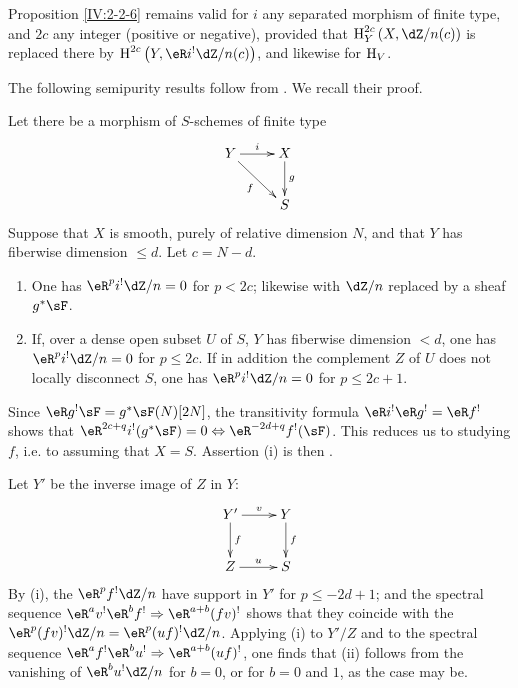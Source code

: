 Proposition \ref{IV:2-2-6} remains valid for $i$ any separated morphism of
finite type, and $2 c$ any integer (positive or negative), provided that
$\h_Y^{2 c}\left(X,\dZ/n(c)\right)$ is replaced there by
$\h^{2 c}\left(Y,\eR i^!\dZ/n(c)\right)$, and likewise for $\operatorname{H}_V$.

The following semipurity results follow from \cite[1.8, 1.10, 1.15]{sga2}.
We recall their proof.






\begin{theorem}\label{IV:2-2-8}
Let there be a morphism of $S$-schemes of finite type
\[\xymatrix{
  Y \ar[r]^-i \ar[dr]_-f
    & X \ar[d]^-g \\
  & S
}\]
Suppose that $X$ is smooth, purely of relative dimension $N$, and that $Y$
has fiberwise dimension $\leqslant d$. Let $c=N-d$.
\begin{enumerate}[\indent (i)]
  \item One has $\eR^p i^!\dZ/n=0$ for $p<2 c$; likewise with $\dZ/n$
    replaced by a sheaf $g^* \sF$.
  \item If, over a dense open subset $U$ of $S$, $Y$ has fiberwise dimension
    $<d$, one has $\eR^p i^!\dZ/n=0$ for $p\leqslant 2 c$. If in addition
    the complement $Z$ of $U$ does not locally disconnect $S$, one has
    $\eR^pi^!\dZ/n=0$ for $p\leqslant 2 c+1$.
\end{enumerate}
\end{theorem}

Since $\eR g^! \sF=g^*\sF(N)[2N]$, the transitivity formula
$\eR i^!\eR g^!=\eR f^!$ shows that
$\eR^{2 c+q} i^!(g^*\sF)=0\Leftrightarrow \eR^{-2 d+q}f^!(\sF)$. This reduces
us to studying $f$, i.e. to assuming that $X=S$. Assertion (i) is then
\cite[XVIII 3.17]{sga4}.

Let $Y'$ be the inverse image of $Z$ in $Y$:
\[\xymatrix{
  Y' \ar[r]^-v \ar[d]^-f
    & Y \ar[d]^-f \\
  Z \ar[r]^-u
    & S
}\]
By (i), the $\eR^p f^! \dZ/n$ have support in $Y'$ for
$p\leqslant -2 d+1$; and the spectral sequence
$\eR^a v^!\eR^b f^! \Rightarrow \eR^{a+b} (f v)^!$ shows that they coincide
with the $\eR^p(f v)^!\dZ/n=\eR^p(u f)^!\dZ/n$. Applying (i) to $Y'/Z$ and
to the spectral sequence
$\eR^a f^!\eR^b u^! \Rightarrow \eR^{a+b} (u f)^!$, one finds that (ii)
follows from the vanishing of $\eR^b u^! \dZ/n$ for $b=0$, or for $b=0$ and
$1$, as the case may be.






